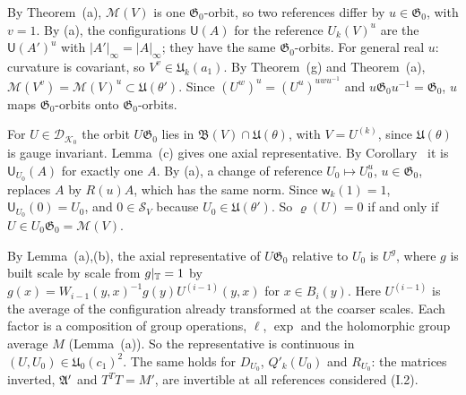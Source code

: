 \begin{detail}\label{d11a:A3}
\begin{step}[(b)]
By Theorem~(a), $\mathscr M(V)$ is one $\mathfrak G_0$-orbit, so two references differ by $u\in\mathfrak G_0$, with $v=1$. By (a), the configurations $\mathsf U(A)$ for the reference $U_k(V)^u$ are the $\mathsf U(A')^u$ with $|A'|_\infty=|A|_\infty$; they have the same $\mathfrak G_0$-orbits. For general real $u$: curvature is covariant, so $V^v\in\mathfrak U_k(a_1)$. By Theorem~(g) and Theorem~(a), $\mathscr M(V^v)=\mathscr M(V)^u\subset\mathfrak U(\theta')$. Since $(U^w)^u=(U^u)^{uwu^{-1}}$ and $u\mathfrak G_0u^{-1}=\mathfrak G_0$, $u$ maps $\mathfrak G_0$-orbits onto $\mathfrak G_0$-orbits.
\end{step}
\begin{step}
For $U\in\mathcal D_{\mathcal K_0}$ the orbit $U\mathfrak G_0$ lies in $\mathfrak B(V)\cap\mathfrak U(\theta)$, with $V=U^{(k)}$, since $\mathfrak U(\theta)$ is gauge invariant. Lemma~(c) gives one axial representative. By Corollary~ it is $\mathsf U_{U_0}(A)$ for exactly one $A$. By (a), a change of reference $U_0\mapsto U_0^u$, $u\in\mathfrak G_0$, replaces $A$ by $R(u)A$, which has the same norm. Since $\mathsf w_k(1)=1$, $\mathsf U_{U_0}(0)=U_0$, and $0\in\mathcal S_V$ because $U_0\in\mathfrak U(\theta')$. So $\varrho(U)=0$ if and only if $U\in U_0\mathfrak G_0=\mathscr M(V)$.
\end{step}
\begin{step}
By Lemma~(a),(b), the axial representative of $U\mathfrak G_0$ relative to $U_0$ is $U^g$, where $g$ is built scale by scale from $g|_\mathbb T=1$ by $g(x)=W_{i-1}(y,x)^{-1}g(y)U^{(i-1)}(y,x)$ for $x\in B_i(y)$. Here $U^{(i-1)}$ is the average of the configuration already transformed at the coarser scales. Each factor is a composition of group operations, $\ell$, $\exp$ and the holomorphic group average $M$ (Lemma~(a)). So the representative is continuous in $(U,U_0)\in\mathfrak U_0(c_1)^2$. The same holds for $D_{U_0}$, $Q'_k(U_0)$ and $R_{U_0}$: the matrices inverted, $\mathfrak A'$ and $T^TT=M'$, are invertible at all references considered (I.2).
\end{step}
\begin{step}

\end{step}
\end{detail}
